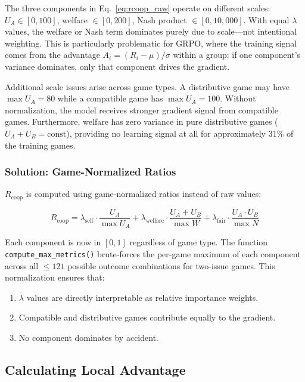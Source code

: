 \documentclass[12pt,a4paper]{article}
\begin{document}
The three components in Eq.~\ref{eq:rcoop_raw} operate on different scales: $U_A \in [0,100]$, welfare $\in [0,200]$, Nash product $\in [0,10{,}000]$. With equal $\lambda$ values, the welfare or Nash term dominates purely due to scale---not intentional weighting. This is particularly problematic for GRPO, where the training signal comes from the advantage $A_i = (R_i - \mu) / \sigma$ within a group: if one component's variance dominates, only that component drives the gradient.

Additional scale issues arise across game types. A distributive game may have $\max U_A = 80$ while a compatible game has $\max U_A = 100$. Without normalization, the model receives stronger gradient signal from compatible games. Furthermore, welfare has zero variance in pure distributive games ($U_A + U_B = \text{const}$), providing no learning signal at all for approximately 31\% of the training games.


\subsubsection{Solution: Game-Normalized Ratios}

$R_{\text{coop}}$ is computed using game-normalized ratios instead of raw values:

\begin{equation}
R_{\text{coop}} = \lambda_{\text{self}} \cdot \frac{U_A}{\max U_A} + \lambda_{\text{welfare}} \cdot \frac{U_A + U_B}{\max W} + \lambda_{\text{fair}} \cdot \frac{U_A \cdot U_B}{\max N}
\label{eq:rcoop_normalized}
\end{equation}

Each component is now in $[0, 1]$ regardless of game type. The function \texttt{compute\_max\_metrics()} brute-forces the per-game maximum of each component across all $\leq 121$ possible outcome combinations for two-issue games. This normalization ensures that:
\begin{enumerate}
    \item $\lambda$ values are directly interpretable as relative importance weights.
    \item Compatible and distributive games contribute equally to the gradient.
    \item No component dominates by accident.
\end{enumerate}


\subsection{Calculating Local Advantage}\label{sec:la_grpo}
\end{document}
